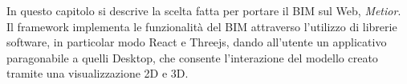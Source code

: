 In questo capitolo si descrive la scelta fatta per portare il BIM sul Web, \emph{Metior}.
Il framework implementa le funzionalit\`a del BIM attraverso l'utilizzo di librerie software,
in particolar modo React e Threejs, dando all'utente un applicativo paragonabile a quelli
Desktop, che consente l'interazione del modello creato tramite una visualizzazione 2D e 3D.
